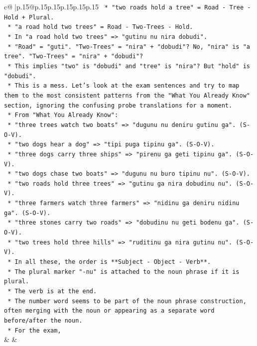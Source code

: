 \documentclass{article}
\begin{document}
{\begin{supertabular}{c@{$\;$}|p{.15\linewidth}@{}p{.15\linewidth}p{.15\linewidth}p{.15\linewidth}p{.15\linewidth}p{.15\linewidth}}
{{{\texttt{        *   "two roads hold a tree" = Road {-} Tree {-} Hold + Plural.} \\
\texttt{        *   "a road hold two trees" = Road {-} Two{-}Trees {-} Hold.} \\
\texttt{        *   In "a road hold two trees" => "gutinu nu nira dobudi".} \\
\texttt{        *   "Road" = "guti". "Two{-}Trees" = "nira" + "dobudi"? No, "nira" is "a tree". "Two{-}Trees" = "nira" + "dobudi"?} \\
\texttt{        *   This implies "two" is "dobudi" and "tree" is "nira"? But "hold" is "dobudi".} \\
\texttt{        *   This is a mess. Let's look at the exam sentences and try to map them to the most consistent patterns from the "What You Already Know" section, ignoring the confusing probe translations for a moment.} \\
\texttt{        *   From "What You Already Know":} \\
\texttt{            *   "three trees watch two boats" => "dugunu nu deniru gutinu ga". (S{-}O{-}V).} \\
\texttt{            *   "two dogs hear a dog" => "tipi puga tipinu ga". (S{-}O{-}V).} \\
\texttt{            *   "three dogs carry three ships" => "pirenu ga geti tipinu ga". (S{-}O{-}V).} \\
\texttt{            *   "two dogs chase two boats" => "dugunu nu buro tipinu nu". (S{-}O{-}V).} \\
\texttt{            *   "two roads hold three trees" => "gutinu ga nira dobudinu nu". (S{-}O{-}V).} \\
\texttt{            *   "three farmers watch three farmers" => "nidinu ga deniru nidinu ga". (S{-}O{-}V).} \\
\texttt{            *   "three stones carry two roads" => "dobudinu nu geti bodenu ga". (S{-}O{-}V).} \\
\texttt{            *   "two trees hold three hills" => "ruditinu ga nira gutinu nu". (S{-}O{-}V).} \\
\texttt{        *   In all these, the order is **Subject {-} Object {-} Verb**.} \\
\texttt{        *   The plural marker "{-}nu" is attached to the noun phrase if it is plural.} \\
\texttt{        *   The verb is at the end.} \\
\texttt{        *   The number word seems to be part of the noun phrase construction, often merging with the noun or appearing as a separate word before/after the noun.} \\
\texttt{        *   For the exam,} \\
            }
        }
    }
    & & \\ \\


\end{supertabular}}
\end{document}

